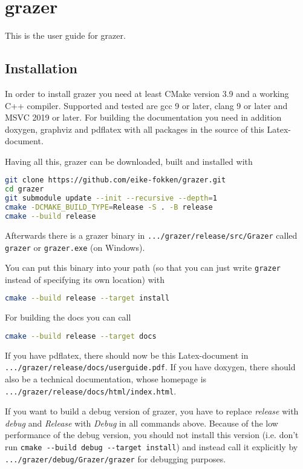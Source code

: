 \documentclass[a4paper]{article}
\begin{document}
\section{grazer}
\label{sec:grazer}
This is the user guide for grazer.

\subsection{Installation}
\label{sec:installation}
In order to install grazer you need at least CMake version 3.9 and a working C++ compiler.
Supported and tested are gcc 9 or later, clang 9 or later and MSVC 2019 or later.
For building the documentation you need in addition doxygen, graphviz and pdflatex with all packages in the source of this Latex-document.

Having all this, grazer can be downloaded, built and installed with
\begin{lstlisting}[language=bash,caption={Build},basicstyle=\scriptsize\ttfamily\color{blue}]
git clone https://github.com/eike-fokken/grazer.git
cd grazer
git submodule update --init --recursive --depth=1
cmake -DCMAKE_BUILD_TYPE=Release -S . -B release
cmake --build release
\end{lstlisting}
Afterwards there is a grazer binary in \verb|.../grazer/release/src/Grazer| called \verb|grazer| or \verb|grazer.exe| (on Windows).

You can put this binary into your path (so that you can just write \verb|grazer| instead of specifying its own location) with
\begin{lstlisting}[language=bash,caption={Installation},basicstyle=\scriptsize\ttfamily\color{blue}]
cmake --build release --target install
\end{lstlisting}

For building the docs you can call
\begin{lstlisting}[language=bash,caption={Building docs},basicstyle=\scriptsize\ttfamily\color{blue}]
cmake --build release --target docs
\end{lstlisting}
If you have pdflatex, there should now be this Latex-document in\\
\verb|.../grazer/release/docs/userguide.pdf|.
If you have doxygen, there should also be a technical documentation, whose homepage is\\
\verb|.../grazer/release/docs/html/index.html|.

If you want to build a debug version of grazer, you have to replace \emph{release} with \emph{debug} and \emph{Release} with \emph{Debug} in all commands above.
Because of the low performance of the debug version, you should not install this version (i.e. don't run \verb|cmake --build debug --target install|) and instead call it explicitly by \verb|.../grazer/debug/Grazer/grazer| for debugging purposes.
\end{document}
